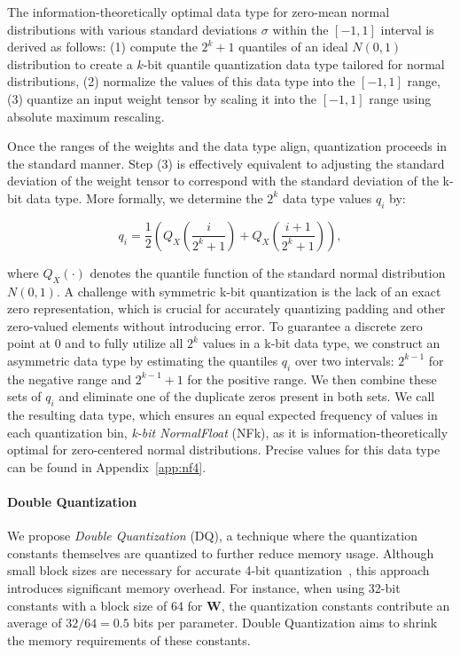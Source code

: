 The information-theoretically optimal data type for zero-mean normal distributions with various standard deviations $\sigma$ within the $[-1, 1]$ interval is derived as follows: (1) compute the $2^k+1$ quantiles of an ideal $N(0, 1)$ distribution to create a $k$-bit quantile quantization data type tailored for normal distributions, (2) normalize the values of this data type into the $[-1, 1]$ range, (3) quantize an input weight tensor by scaling it into the $[-1, 1]$ range using absolute maximum rescaling.

Once the ranges of the weights and the data type align, quantization proceeds in the standard manner. Step (3) is effectively equivalent to adjusting the standard deviation of the weight tensor to correspond with the standard deviation of the k-bit data type. More formally, we determine the $2^k$ data type values $q_i$ by:

\begin{equation}
q_i  = \frac{1}{2}\left( Q_X\left(\frac{i}{2^k+1}\right) + Q_X\left(\frac{i+1}{2^k+1}\right)\right),
\end{equation}

where $Q_X(\cdot)$ denotes the quantile function of the standard normal distribution $N(0,1)$. A challenge with symmetric k-bit quantization is the lack of an exact zero representation, which is crucial for accurately quantizing padding and other zero-valued elements without introducing error. To guarantee a discrete zero point at $0$ and to fully utilize all $2^k$ values in a k-bit data type, we construct an asymmetric data type by estimating the quantiles $q_i$ over two intervals: $2^{k-1}$ for the negative range and $2^{k-1}+1$ for the positive range. We then combine these sets of $q_i$ and eliminate one of the duplicate zeros present in both sets. We call the resulting data type, which ensures an equal expected frequency of values in each quantization bin, \emph{k-bit NormalFloat} (NFk), as it is information-theoretically optimal for zero-centered normal distributions. Precise values for this data type can be found in Appendix~\ref{app:nf4}.

\paragraph{Double Quantization{}} 
We propose \emph{Double Quantization} (DQ), a technique where the quantization constants themselves are quantized to further reduce memory usage. Although small block sizes are necessary for accurate 4-bit quantization~\citep{dettmers2022case}, this approach introduces significant memory overhead. For instance, when using 32-bit constants with a block size of 64 for $\mathbf{W}$, the quantization constants contribute an average of $32/64 = 0.5$ bits per parameter. Double Quantization aims to shrink the memory requirements of these constants.


